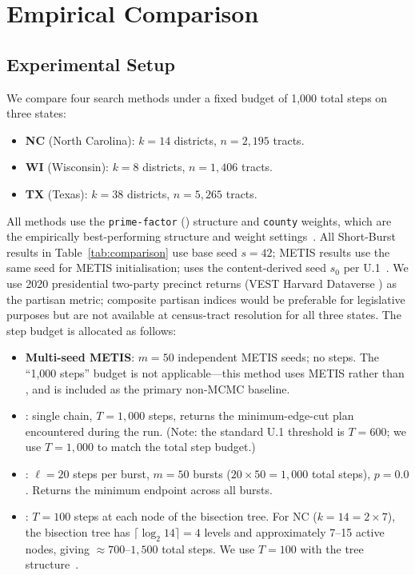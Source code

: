 \section{Empirical Comparison}
\label{sec:comparison}

\subsection{Experimental Setup}

We compare four search methods under a fixed budget of 1{,}000 total
\recom{} steps on three states:

\begin{itemize}
\item \textbf{NC} (North Carolina): $k = 14$ districts, $n = 2{,}195$ tracts.
\item \textbf{WI} (Wisconsin): $k = 8$ districts, $n = 1{,}406$ tracts.
\item \textbf{TX} (Texas): $k = 38$ districts, $n = 5{,}265$ tracts.
\end{itemize}

All methods use the \texttt{prime-factor} (\ar{}) structure and
\texttt{county} weights, which are the empirically best-performing
structure and weight settings~\citep{b11paper}.
All Short-Burst results in Table~\ref{tab:comparison} use base seed
$s = 42$; METIS results use the same seed for METIS initialisation;
\cs{} uses the content-derived seed $s_0$ per U.1~\citep{b16paper}.
We use 2020 presidential two-party precinct returns
(VEST Harvard Dataverse \citep{vest2020}) as the partisan metric;
composite partisan indices would be preferable for legislative purposes
but are not available at census-tract resolution for all three states.
The step budget is allocated as follows:

\begin{itemize}
\item \textbf{Multi-seed METIS}: $m = 50$ independent METIS seeds;
      no \recom{} steps.
      The ``1{,}000 steps'' budget is not applicable---this method
      uses METIS rather than \recom{}, and is included as the primary
      non-MCMC baseline.

\item \textbf{\cs{}}: single \recom{} chain, $T = 1{,}000$ steps,
      returns the minimum-edge-cut plan encountered during the run.
      (Note: the standard U.1 threshold is $T = 600$; we use $T = 1{,}000$
      to match the total step budget.)

\item \textbf{\shb{}}: $\ell = 20$ steps per burst, $m = 50$ bursts
      ($20 \times 50 = 1{,}000$ total steps), $p = 0.0$.
      Returns the minimum endpoint across all bursts.

\item \textbf{\be{}}: $T = 100$ steps at each node of the \ar{}
      bisection tree.
      For NC ($k = 14 = 2 \times 7$), the bisection tree has
      $\lceil \log_2 14 \rceil = 4$ levels and approximately 7--15
      active nodes, giving $\approx 700$--$1{,}500$ total steps.
      We use $T = 100$ with the \ar{} tree structure~\citep{h1paper}.
\end{itemize}

